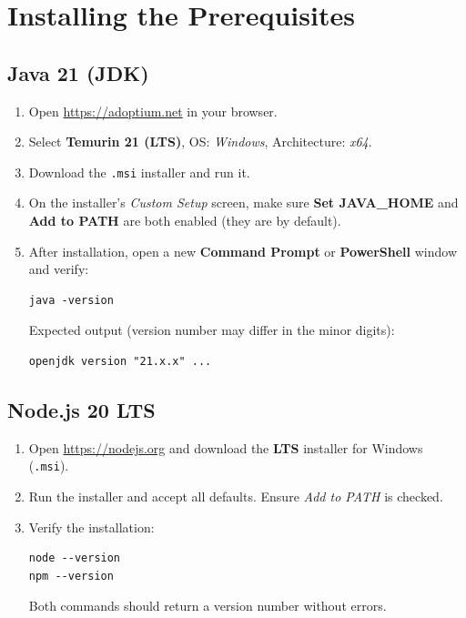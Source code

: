 \documentclass[12pt,a4paper]{article}
\begin{document}
\section{Installing the Prerequisites}

\subsection{Java 21 (JDK)}
\begin{enumerate}[noitemsep]
  \item Open \url{https://adoptium.net} in your browser.
  \item Select \textbf{Temurin 21 (LTS)}, OS: \emph{Windows}, Architecture: \emph{x64}.
  \item Download the \texttt{.msi} installer and run it.
  \item On the installer's \emph{Custom Setup} screen, make sure
        \textbf{Set JAVA\_HOME} and \textbf{Add to PATH} are both enabled (they
        are by default).
  \item After installation, open a new \textbf{Command Prompt} or
        \textbf{PowerShell} window and verify:
\begin{lstlisting}
java -version
\end{lstlisting}
        Expected output (version number may differ in the minor digits):
\begin{lstlisting}
openjdk version "21.x.x" ...
\end{lstlisting}
\end{enumerate}

\subsection{Node.js 20 LTS}
\begin{enumerate}[noitemsep]
  \item Open \url{https://nodejs.org} and download the \textbf{LTS} installer
        for Windows (\texttt{.msi}).
  \item Run the installer and accept all defaults.  Ensure \emph{Add to PATH}
        is checked.
  \item Verify the installation:
\begin{lstlisting}
node --version
npm --version
\end{lstlisting}
        Both commands should return a version number without errors.
\end{enumerate}
\end{document}

